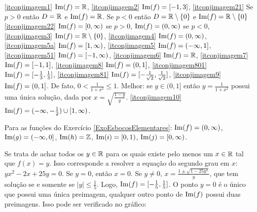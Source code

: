\begin{Solution}{2.24}
\eqref{itconjimagem1} $\operatorname{Im}(f)=\mathbb{R}$,
\eqref{itconjimagem2} $\operatorname{Im}(f)=[-1,3]$,
\eqref{itconjimagem21} Se $p>0$ então $D=\mathbb{R}$ e $\operatorname{Im}(f)=\mathbb{R}$. Se
$p<0$ então $D=\mathbb{R}\setminus\{0\}$ e $\operatorname{Im}(f)=\mathbb{R}\setminus\{0\}$
\eqref{itconjimagem22} $\operatorname{Im}(f)=[0,\infty)$ se $p>0$, $\operatorname{Im}(f)=(0,\infty)$ se $p<0$,
\eqref{itconjimagem3} $\operatorname{Im}(f)=\mathbb{R}\setminus \{0\}$,
\eqref{itconjimagem4} $\operatorname{Im}(f)=(0,\infty)$,
\eqref{itconjimagem5a} $\operatorname{Im}(f)=[1,\infty)$,
\eqref{itconjimagem5} $\operatorname{Im}(f)=(-\infty,1]$,
\eqref{itconjimagem51} $\operatorname{Im}(f)=[-1,\infty)$,
\eqref{itconjimagem6} $\operatorname{Im}(f)=\mathbb{R}$,
\eqref{itconjimagem7} $\operatorname{Im}(f)=[-1,1]$,
\eqref{itconjimagem8} $\operatorname{Im}(f)=(0,1]$,
\eqref{itconjimagem801} $\operatorname{Im}(f)=[-\tfrac13,\tfrac13]$,
\eqref{itconjimagem81} $\operatorname{Im}(f)=[-\tfrac{1}{\sqrt{2}},\tfrac{1}{\sqrt{2}}]$,
\eqref{itconjimagem9} $\operatorname{Im}(f)=(0,1]$. De fato, $0<\frac{1}{1+x^2}\leq 1$. Melhor:
se $y\in (0,1]$ então $y=\frac{1}{1+x^2}$ possui uma única solução, dada por
$x=\sqrt{\frac{1-y}{y}}$.
\eqref{itconjimagem10} $\operatorname{Im}(f)=(-\infty,-\tfrac12)\cup [1,\infty)$.

Para as funções do Exercício \ref{ExoEsbocosElementares}:
$\operatorname{Im}(f)=(0,\infty)$,
$\operatorname{Im}(g)=(-\infty,0]$,
$\operatorname{Im}(h)=\mathbb{Z}$,
$\operatorname{Im}(i)=[0,1)$,
$\operatorname{Im}(j)=[0,\infty)$.
\end{Solution}
\begin{Solution}{2.25}
Se trata de achar todos os $y\in \mathbb{R}$ para os quais existe pelo menos um $x\in
\mathbb{R}$ tal que $f(x)=y$. Isso corresponde a resolver a equação do segundo grau em
$x$: $yx^2-2x+25y=0$. Se $y=0$, então $x=0$. Se $y\neq 0$,
$x=\frac{1\pm\sqrt{1-25y^2}}{y}$, que tem solução se e somente se
$|y|\leq\tfrac15$.
Logo, $\operatorname{Im}(f)=[-\tfrac15,\tfrac15]$. O ponto $y=0$ é o único que possui uma única preimagem, qualquer outro ponto de $\operatorname{Im}(f)$ possui duas preimagens. Isso pode ser verificado no gráfico:
\begin{center}
 \begin{bmlimage}\end{bmlimage}
\end{center}
\end{Solution}
